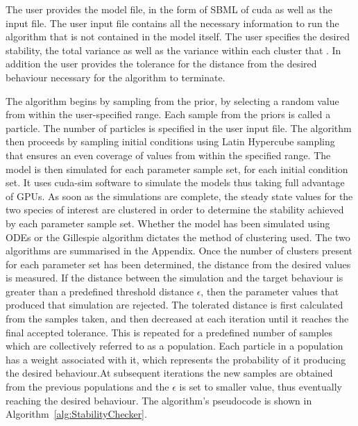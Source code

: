  The user provides the model file, in the form of SBML of cuda as well as the input file. The user input file contains all the necessary information to run the algorithm that is not contained in the model itself. The user specifies the desired stability, the total variance as well as the variance within each cluster that . In addition the user provides the tolerance for the distance from the desired behaviour necessary for the algorithm to terminate. 

 The algorithm begins by sampling from the prior, by selecting a random value from within the user-specified range. Each sample from the priors is called a particle. The number of particles is specified in the user input file. The algorithm then proceeds by sampling initial conditions using Latin Hypercube sampling that ensures an even coverage of values from within the specified range. The model is then simulated for each parameter sample set, for each initial condition set.  It uses cuda-sim software \autocite{Zhou:2011hp} to simulate the models thus taking full advantage of GPUs.  As soon as the simulations are complete, the steady state values for the two species of interest are clustered in order to determine the stability achieved by each parameter sample set. Whether the model has been simulated using ODEs or the Gillespie algorithm dictates the method of clustering used. The two algorithms are summarised in the Appendix. Once the number of clusters present for each parameter set has been determined, the distance from the desired values is measured. If the distance between the simulation and the target behaviour is greater than a predefined threshold distance $\epsilon$, then the parameter values that produced that simulation are rejected. The tolerated distance is first calculated from the samples taken, and then decreased at each iteration until it reaches the final accepted tolerance. This is repeated for a predefined number of samples which are collectively referred to as a population. Each particle in a population has a weight associated with it, which represents the probability of it producing the desired behaviour.At subsequent iterations the new samples are obtained from the previous populations and the $\epsilon$ is set to smaller value, thus eventually reaching the desired behaviour. The algorithm's pseudocode is shown in Algorithm~\ref{alg:StabilityChecker}. 

